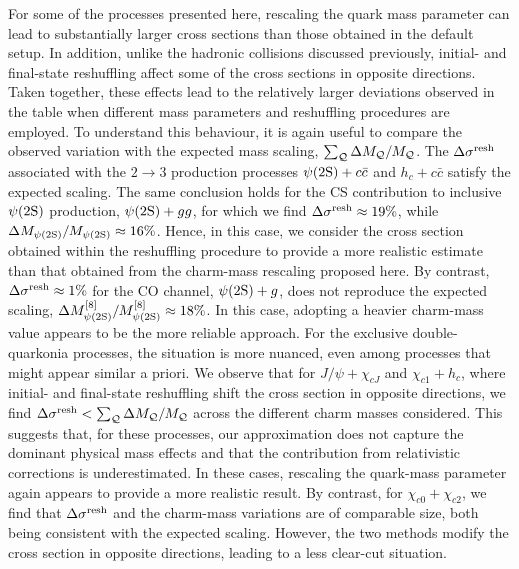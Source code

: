 For some of the processes presented here, rescaling the quark mass parameter can lead to substantially larger cross sections than those obtained in the default setup.
In addition, unlike the hadronic collisions discussed previously, initial- and final-state reshuffling affect some of the cross sections in opposite directions.
Taken together, these effects lead to the relatively larger deviations observed in the table when different mass parameters and reshuffling procedures are employed.
To understand this behaviour, it is again useful to compare the observed variation with the expected mass scaling, $\sum_{\cal Q}\Delta M_{\cal Q}/M_{\cal Q}$.
The $\Delta \sigma^{\rm resh}$ associated with the $2\to3$ production processes $\psi(2\mathrm{S}) + c\bar{c}$ and $h_c + c\bar{c}$ satisfy the expected scaling.
The same conclusion holds for the CS contribution to inclusive $\psi(2\mathrm{S})$ production, $\psi(2\mathrm{S}) + gg$, for which we find $\Delta \sigma^{\rm resh} \approx 19\%$, while $\Delta M_{\psi(2\mathrm{S})}/M_{\psi(2\mathrm{S})} \approx 16\%$. Hence, in this case, we consider the cross section obtained within the reshuffling procedure to provide a more realistic estimate than that obtained from the charm-mass rescaling proposed here.
By contrast, $\Delta \sigma^{\rm resh}\approx1\%$ for the CO channel, $\psi(2\mathrm{S}) + g$, does not reproduce the expected scaling, $\Delta M_{\psi(2\mathrm{S})}^{[8]}/M_{\psi(2\mathrm{S})}^{[8]} \approx 18\%$. In this case, adopting a heavier charm-mass value appears to be the more reliable approach. 
For the exclusive double-quarkonia processes, the situation is more nuanced, even among processes that might appear similar a priori.
We observe that for $J/\psi + \chi_{cJ}$ and $\chi_{c1} + h_c$, where initial- and final-state reshuffling shift the cross section in opposite directions, we find $\Delta \sigma^{\rm resh} < \sum_{\cal Q}\Delta M_{\cal Q}/M_{\cal Q}$ across the different charm masses considered. This suggests that, for these processes, our approximation does not capture the dominant physical mass effects and that the contribution from relativistic corrections is underestimated. In these cases, rescaling the quark-mass parameter again appears to provide a more realistic result. By contrast, for $\chi_{c0} + \chi_{c2}$, we find that $\Delta \sigma^{\rm resh}$ and the charm-mass variations are of comparable size, both being consistent with the expected scaling. However, the two methods modify the cross section in opposite directions, leading to a less clear-cut situation.

